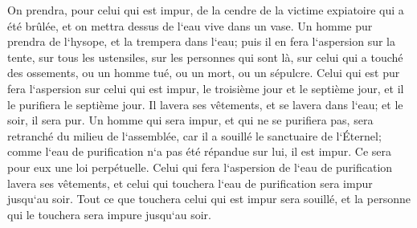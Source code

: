\verse On prendra, pour celui qui est impur, de la cendre de la victime expiatoire qui a été brûlée, et on mettra dessus de l`eau vive dans un vase. 
\verse Un homme pur prendra de l`hysope, et la trempera dans l`eau; puis il en fera l`aspersion sur la tente, sur tous les ustensiles, sur les personnes qui sont là, sur celui qui a touché des ossements, ou un homme tué, ou un mort, ou un sépulcre. 
\verse Celui qui est pur fera l`aspersion sur celui qui est impur, le troisième jour et le septième jour, et il le purifiera le septième jour. Il lavera ses vêtements, et se lavera dans l`eau; et le soir, il sera pur. 
\verse Un homme qui sera impur, et qui ne se purifiera pas, sera retranché du milieu de l`assemblée, car il a souillé le sanctuaire de l`Éternel; comme l`eau de purification n`a pas été répandue sur lui, il est impur. 
\verse Ce sera pour eux une loi perpétuelle. Celui qui fera l`aspersion de l`eau de purification lavera ses vêtements, et celui qui touchera l`eau de purification sera impur jusqu`au soir. 
\verse Tout ce que touchera celui qui est impur sera souillé, et la personne qui le touchera sera impure jusqu`au soir. 

